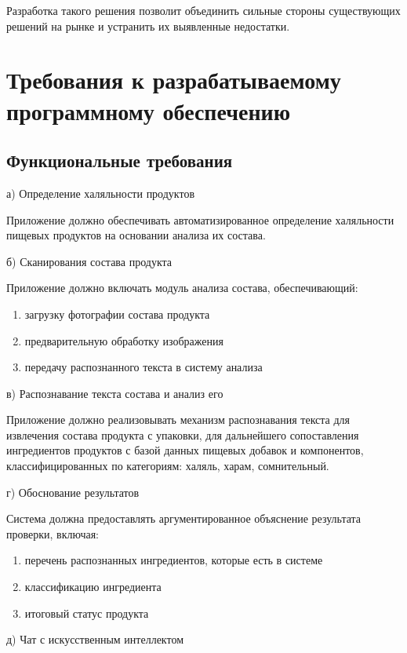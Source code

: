 Разработка такого решения позволит объединить сильные стороны существующих решений на рынке и устранить их выявленные недостатки.


\section{Требования к разрабатываемому программному обеспечению}


\subsection{Функциональные требования}


а) Определение халяльности продуктов


Приложение должно обеспечивать автоматизированное определение халяльности пищевых продуктов на основании анализа их состава.


б) Сканирования состава продукта


Приложение должно включать модуль анализа состава, обеспечивающий:

\begin{enumerate}
	\item загрузку фотографии состава продукта
	\item предварительную обработку изображения
	\item передачу распознанного текста в систему анализа
\end{enumerate}

в) Распознавание текста состава и анализ его


Приложение должно реализовывать механизм распознавания текста для извлечения состава продукта с упаковки, для дальнейшего сопоставления ингредиентов продуктов с базой данных пищевых добавок и компонентов, классифицированных по категориям: халяль, харам, сомнительный.


г) Обоснование результатов


Система должна предоставлять аргументированное объяснение результата проверки, включая:

\begin{enumerate}
	\item перечень распознанных ингредиентов, которые есть в системе
	\item классификацию ингредиента
	\item итоговый статус продукта
\end{enumerate}

д) Чат с искусственным интеллектом


